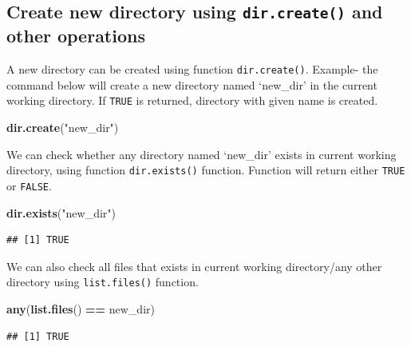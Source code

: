\documentclass[
]{book}
\newenvironment{Shaded}{\begin{snugshade}}{\end{snugshade}}
\newcommand{\FunctionTok}[1]{\textcolor[rgb]{0.13,0.29,0.53}{\textbf{#1}}}
\newcommand{\NormalTok}[1]{#1}
\newcommand{\SpecialCharTok}[1]{\textcolor[rgb]{0.81,0.36,0.00}{\textbf{#1}}}
\newcommand{\StringTok}[1]{\textcolor[rgb]{0.31,0.60,0.02}{#1}}
\begin{document}
\hypertarget{create-new-directory-using-dir.create-and-other-operations}{%
\subsection{\texorpdfstring{Create new directory using \texttt{dir.create()} and other operations}{Create new directory using dir.create() and other operations}}\label{create-new-directory-using-dir.create-and-other-operations}}

A new directory can be created using function \texttt{dir.create()}. Example- the command below will create a new directory named `new\_dir' in the current working directory. If \texttt{TRUE} is returned, directory with given name is created.

\begin{Shaded}
\begin{Highlighting}[]
\FunctionTok{dir.create}\NormalTok{(}\StringTok{"new\_dir"}\NormalTok{)}
\end{Highlighting}
\end{Shaded}

We can check whether any directory named `new\_dir' exists in current working directory, using function \texttt{dir.exists()} function. Function will return either \texttt{TRUE} or \texttt{FALSE}.

\begin{Shaded}
\begin{Highlighting}[]
\FunctionTok{dir.exists}\NormalTok{(}\StringTok{"new\_dir"}\NormalTok{)}
\end{Highlighting}
\end{Shaded}

\begin{verbatim}
## [1] TRUE
\end{verbatim}

We can also check all files that exists in current working directory/any other directory using \texttt{list.files()} function.

\begin{Shaded}
\begin{Highlighting}[]
\FunctionTok{any}\NormalTok{(}\FunctionTok{list.files}\NormalTok{() }\SpecialCharTok{==} \StringTok{\textquotesingle{}new\_dir\textquotesingle{}}\NormalTok{)}
\end{Highlighting}
\end{Shaded}

\begin{verbatim}
## [1] TRUE
\end{verbatim}
\end{document}
